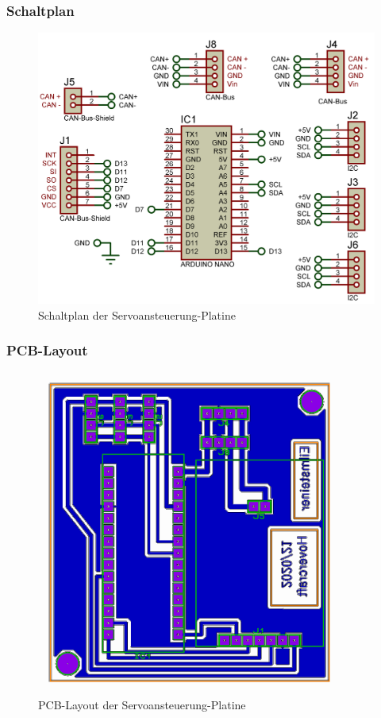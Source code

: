 \newpage
\subsubsection{Schaltplan}
\begin{figure}[h]
    \centering
    \includegraphics[width=1.0\textwidth]{../Proteus/Exports/Servos-Platine.png}    
    \caption{Schaltplan der Servoansteuerung-Platine\label{fig:plat:servo}}
\end{figure}

\newpage
\subsubsection{PCB-Layout}
\begin{figure}[h]
    \centering
    \includegraphics[width=0.9\textwidth]{../Proteus/Exports/Servos-Platine-PCB.png}    
    \caption{PCB-Layout der Servoansteuerung-Platine}
\end{figure}


